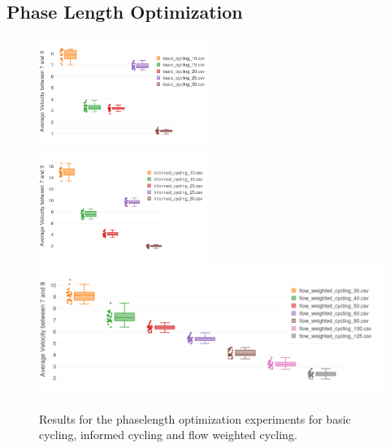 \documentclass[11pt]{article}
\begin{document}
\begin{appendix}
\section{Phase Length Optimization}
\begin{figure}[h]
\includegraphics[width=0.5\textwidth]{img/basic-opt.png}
\includegraphics[width=0.5\textwidth]{img/informed-opt.png}
\includegraphics[width=\textwidth]{img/flow-opt.png}
\caption{Results for the phaselength optimization experiments for basic cycling, informed cycling and flow weighted cycling. \label{fig:opt-results}}
\end{figure}

\end{appendix}
\end{document}
